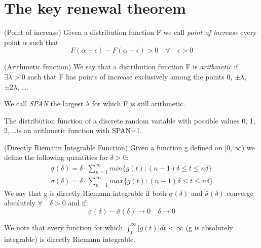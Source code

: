 \section{The key renewal theorem}
\begin{definition}
	(Point of increase) Given a distribution function F we call \textit{point of increase} every point $\alpha$ such that
	\begin{equation}
		F(\alpha+\epsilon)-F(\alpha-\epsilon)>0 \quad  \forall \quad
		\epsilon > 0
	\end{equation}
\end{definition}
\begin{definition}
	(Arithmetic function) We say that a distribution function F is \textit{arithmetic} if $\exists \lambda > 0$ such that F has points of increase exclusively among the points 0, $\pm \lambda$, $\pm 2\lambda$, \dots .

	We call \textit{SPAN} the largest $\lambda$ for which F is still arithmetic.
\end{definition}

The distribution function of a discrete random variable with possible values 0, 1, 2, \dots is an arithmetic function with SPAN=1.

\begin{definition}
	(Directly Riemann Integrable Function) Given a function g defined on [0, $\infty$) we define the following quantities for $\delta > 0$:
	\begin{align*}
		\underline \sigma (\delta) = \delta \cdot \sum_{n=1}^{\infty} min\{g(t):(n-1)\delta \leq t \leq n \delta \}
		\\
		\bar \sigma (\delta) = \delta \cdot \sum_{n=1}^{\infty}max\{g(t):(n-1)\delta \leq t \leq n \delta \}
	\end{align*}
	We say that g is directly Riemann integrable if both $\underline \sigma (\delta)$ and $\bar \sigma (\delta)$ converge absolutely $\forall \quad \delta > 0$ and if:
	\begin{equation}
		\underline \sigma (\delta) - \bar \sigma (\delta) \rightarrow 0 \quad \delta \rightarrow 0
		\end{equation}
\end{definition}

We note that every function for which $\int_{0}^{\infty} |g(t)| dt$ < $\infty$ (g is absolutely integrable) is directly Riemann integrable.


